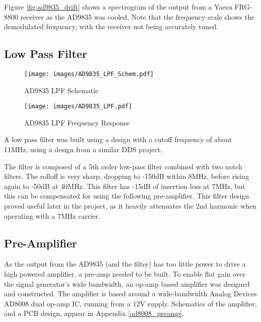 \documentclass[a4paper,12pt]{article}
\begin{document}
Figure \ref{fig:ad9835_drift} shows a spectrogram of the output from a Yaesu FRG-8800 receiver as the AD9835 was cooled. Note that the frequency scale shows the demodulated frequency, with the receiver not being accurately tuned. 

\subsection{Low Pass Filter}
\begin{figure}
  \begin{center}
    \texttt{[image: images/AD9835\_LPF\_Schem.pdf]}
  \end{center}
  \caption{AD9835 LPF Schematic}
  \label{fig:ad9835_lpf_schem}
\end{figure}

\begin{figure}
  \begin{center}
    \texttt{[image: images/AD9835\_LPF.pdf]}
  \end{center}
  \caption{AD9835 LPF Frequency Response}
  \label{fig:ad9835_lpf}
\end{figure}

A low pass filter was built using a design with a cutoff frequency of about 11MHz, using a design from a similar DDS project\citep{ref:lpf}.  

The filter is composed of a 5th order low-pass filter combined with two notch filters. The rolloff is very sharp, dropping to -150dB within 8MHz, before rising again to -50dB at 40MHz. This filter has -15dB of insertion loss at 7MHz, but this can be compensated for using the following pre-amplifier. This filter design proved useful later in the project, as it heavily attenuates the 2nd harmonic when operating with a 7MHz carrier.

\subsection{Pre-Amplifier}

As the output from the AD9835 (and the filter) has too little power to drive a high powered amplifier, a pre-amp needed to be built. To enable flat gain over the signal generator's wide bandwidth, an op-amp based amplifier was designed and constructed. The amplifier is based around a wide-bandwidth Analog Devices AD8008 dual op-amp IC, running from a 12V supply. Schematics of the amplifier, and a PCB design, appear in Appendix \ref{ad8008_preamp}.
\end{document}
